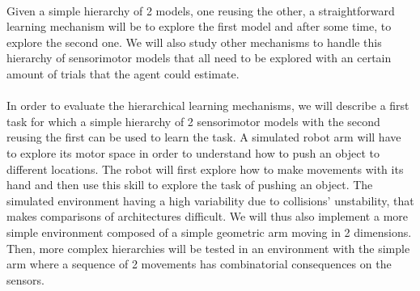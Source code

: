 \documentclass[12pt]{article}
\begin{document}
	\paragraph{}
	Given a simple hierarchy of 2 models, one reusing the other, a straightforward learning mechanism will be to explore the first model 
	and after some time, to explore the second one. 
	We will also study other mechanisms to handle this hierarchy of sensorimotor models that all need to be explored with an certain amount of trials that 
	the agent could estimate.	
	
	\paragraph{}
	In order to evaluate the hierarchical learning mechanisms, we will describe a first task for which a simple hierarchy of 2 sensorimotor models
	with the second reusing the first can be used to learn the task.
	A simulated robot arm will have to explore its motor space in order to understand how to push an object to different locations. 
	The robot will first explore how to make movements with its hand and then use this skill to explore the task of pushing an object.		
	The simulated environment having a high variability due to collisions' unstability, that makes comparisons of architectures difficult.	
	We will thus also implement a more simple environment composed of a simple geometric arm moving in 2 dimensions.
	Then, more complex hierarchies will be tested in an environment with the simple arm where a sequence of 2 movements has combinatorial 
	consequences on the sensors. 
	
\end{document}
